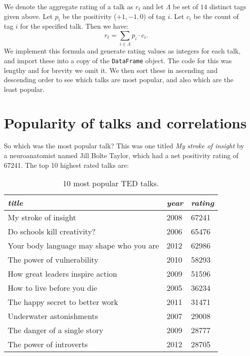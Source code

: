 \documentclass[11pt,oneside,reqno]{amsart}
\theoremstyle{plain}
\theoremstyle{definition}
\theoremstyle{remark}
\newcommand{\inlinecode}{\texttt}
\newcommand{\ra}[1]{\renewcommand{\arraystretch}{#1}}
\begin{document}
We denote the aggregate rating of a talk as $r_t$ and let $\Lambda$ be set of $14$ distinct tags given above. Let $p_i$ be the positivity ($+1,-1,0$) of tag $i$. Let $c_i$ be the count of tag $i$ for the specified talk. Then we have:
$$
r_t = \sum_{i \in \Lambda} p_i \cdot c_i.
$$
We implement this formula and generate rating values as integers for each talk, and import these into a copy of the \inlinecode{DataFrame} object. The code for this was lengthy and for brevity we omit it. We then sort these in ascending and descending order to see which talks are most popular, and also which are the least popular. 
\section{Popularity of talks and correlations}

So which was the most popular talk? This was one titled \textit{My stroke of insight} by a neuroanatomist named Jill Bolte Taylor, which had a net positivity rating of 67241. The top 10 highest rated talks are: 

 \begin{table}[H]\label{table4}\centering
\ra{1.2}
\begin{tabular}{@{}lll@{}}\toprule[1.7pt]
\textit{title} & \textit{year}
& \textit{rating}\\
\midrule
My stroke of insight & 2008 & 67241\\
Do schools kill creativity? & 2006 & 65476\\
Your body language may shape who you are & 2012 & 62986\\
The power of vulnerability & 2010 & 58293\\
How great leaders inspire action & 2009 & 51596\\
How to live before you die & 2005 & 36234\\
The happy secret to better work & 2011 & 31471\\
Underwater astonishments & 2007 & 29008\\
The danger of a single story & 2009 & 28777\\
The power of introverts & 2012 & 28705\\
\bottomrule[1.7pt]
\end{tabular}
\vspace{1mm}
\caption{10 most popular TED talks.  } 
\end{table}
\end{document}
